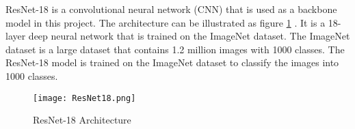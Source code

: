 ResNet-18 is a convolutional neural network (CNN) that is used as a backbone model in this project. The architecture can be illustrated as figure \ref{fig:resnet18} \cite{ResNet-18}.
It is a 18-layer deep neural network that is trained on the ImageNet dataset. The ImageNet dataset is a large dataset that contains 1.2 million images with 1000 classes. The ResNet-18 model is trained on the ImageNet dataset to classify the images into 1000 classes.


\begin{figure}[h]
\centering
\texttt{[image: ResNet18.png]}
\caption{ResNet-18 Architecture}
\label{fig:resnet18}
\end{figure}

